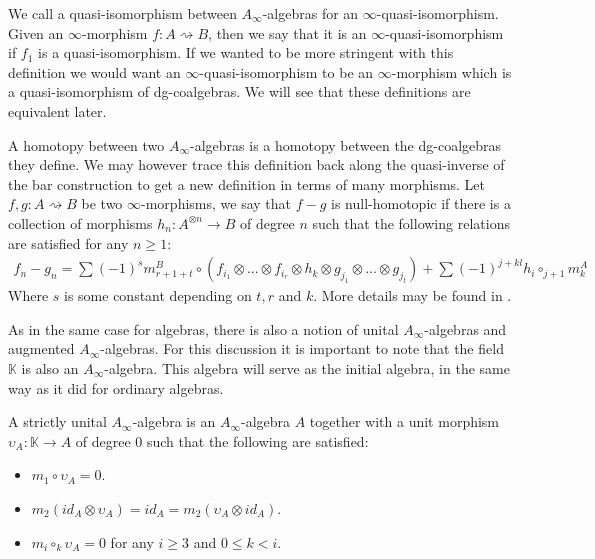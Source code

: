 \documentclass[../thesis.tex]{subfiles}
\begin{document}
        We call a quasi-isomorphism between $A_\infty$-algebras for an $\infty$-quasi-isomorphism. Given an $\infty$-morphism $f: A\rightsquigarrow B$, then we say that it is an $\infty$-quasi-isomorphism if $f_1$ is a quasi-isomorphism. If we wanted to be more stringent with this definition we would want an $\infty$-quasi-isomorphism to be an $\infty$-morphism which is a quasi-isomorphism of dg-coalgebras. We will see that these definitions are equivalent later.

        A homotopy between two $A_\infty$-algebras is a homotopy between the dg-coalgebras they define. We may however trace this definition back along the quasi-inverse of the bar construction to get a new definition in terms of many morphisms. Let $f,g: A\rightsquigarrow B$ be two $\infty$-morphisms, we say that $f-g$ is null-homotopic if there is a collection of morphisms $h_n : A^{\otimes n} \rightarrow B$ of degree $n$ such that the following relations are satisfied for any $n \geq 1$:
        \begin{multline*}
            f_n - g_n = \sum (-1)^s m^B_{r+1+t}\circ (f_{i_1}\otimes ... \otimes f_{i_r} \otimes h_k \otimes g_{j_1} \otimes ... \otimes g_{j_t}) +  \sum (-1)^{j+kl}h_i \circ_{j+1} m_k^A
        \end{multline*}
        Where $s$ is some constant depending on $t,r$ and $k$. More details may be found in \cite{LefevreHasegawa03}.

        As in the same case for algebras, there is also a notion of unital $A_\infty$-algebras and augmented $A_\infty$-algebras. For this discussion it is important to note that the field $\mathbb{K}$ is also an $A_\infty$-algebra. This algebra will serve as the initial algebra, in the same way as it did for ordinary algebras.

        \begin{definition}
            A strictly unital $A_\infty$-algebra is an $A_\infty$-algebra $A$ together with a unit morphism $\upsilon_A : \mathbb{K} \rightarrow A$ of degree $0$ such that the following are satisfied:
            \begin{itemize}
                \item $m_1\circ \upsilon_A = 0$.
                \item $m_2(id_A \otimes \upsilon_A) = id_A = m_2(\upsilon_A\otimes id_A)$.
                \item $m_i \circ_k \upsilon_A = 0$ for any $i\geq 3$ and $0 \leq k < i$.
            \end{itemize}
        \end{definition}
\end{document}
